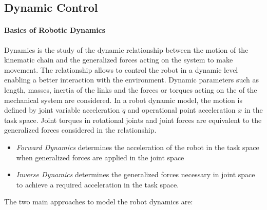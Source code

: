 \subsection{Dynamic Control}

\paragraph{Basics of Robotic Dynamics}
Dynamics is the study of the dynamic relationship between the motion of the kinematic chain and the generalized forces acting on the system to make movement. The relationship allows to control the robot in a dynamic level enabling a better interaction with the environment. Dynamic parameters such as length, masses, inertia of the links and the forces or torques acting on the 
of the mechanical system are considered. In a robot dynamic model, the motion is defined by joint variable acceleration $\ddot{q}$ and operational point acceleration $\ddot{x}$ in the task space. Joint torques in rotational joints and joint forces are equivalent to the generalized forces considered in the relationship.

\begin{itemize}
    \item \textit{Forward Dynamics} determines the acceleration of the robot in the task space when generalized forces are applied in the joint space
    \item \textit{Inverse Dynamics} determines the generalized forces necessary in joint space to achieve a required acceleration in the task space.
\end{itemize}

The two main approaches to model the robot dynamics are:

